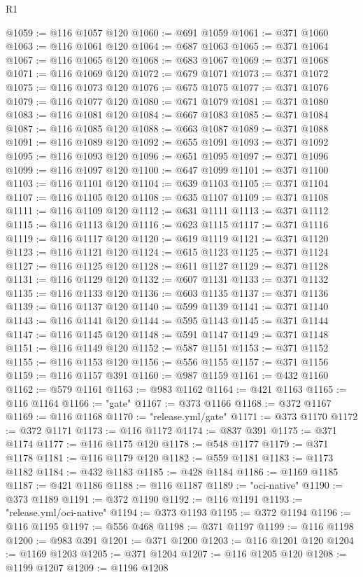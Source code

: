\begin{lexlean}{R1}
\begin{coremodule}
@1059 := @116 @1057 @120
@1060 := @691 @1059
@1061 := @371 @1060
@1063 := @116 @1061 @120
@1064 := @687 @1063
@1065 := @371 @1064
@1067 := @116 @1065 @120
@1068 := @683 @1067
@1069 := @371 @1068
@1071 := @116 @1069 @120
@1072 := @679 @1071
@1073 := @371 @1072
@1075 := @116 @1073 @120
@1076 := @675 @1075
@1077 := @371 @1076
@1079 := @116 @1077 @120
@1080 := @671 @1079
@1081 := @371 @1080
@1083 := @116 @1081 @120
@1084 := @667 @1083
@1085 := @371 @1084
@1087 := @116 @1085 @120
@1088 := @663 @1087
@1089 := @371 @1088
@1091 := @116 @1089 @120
@1092 := @655 @1091
@1093 := @371 @1092
@1095 := @116 @1093 @120
@1096 := @651 @1095
@1097 := @371 @1096
@1099 := @116 @1097 @120
@1100 := @647 @1099
@1101 := @371 @1100
@1103 := @116 @1101 @120
@1104 := @639 @1103
@1105 := @371 @1104
@1107 := @116 @1105 @120
@1108 := @635 @1107
@1109 := @371 @1108
@1111 := @116 @1109 @120
@1112 := @631 @1111
@1113 := @371 @1112
@1115 := @116 @1113 @120
@1116 := @623 @1115
@1117 := @371 @1116
@1119 := @116 @1117 @120
@1120 := @619 @1119
@1121 := @371 @1120
@1123 := @116 @1121 @120
@1124 := @615 @1123
@1125 := @371 @1124
@1127 := @116 @1125 @120
@1128 := @611 @1127
@1129 := @371 @1128
@1131 := @116 @1129 @120
@1132 := @607 @1131
@1133 := @371 @1132
@1135 := @116 @1133 @120
@1136 := @603 @1135
@1137 := @371 @1136
@1139 := @116 @1137 @120
@1140 := @599 @1139
@1141 := @371 @1140
@1143 := @116 @1141 @120
@1144 := @595 @1143
@1145 := @371 @1144
@1147 := @116 @1145 @120
@1148 := @591 @1147
@1149 := @371 @1148
@1151 := @116 @1149 @120
@1152 := @587 @1151
@1153 := @371 @1152
@1155 := @116 @1153 @120
@1156 := @556 @1155
@1157 := @371 @1156
@1159 := @116 @1157 @391
@1160 := @987 @1159
@1161 := @432 @1160
@1162 := @579 @1161
@1163 := @983 @1162
@1164 := @421 @1163
@1165 := @116 @1164
@1166 := "gate"
@1167 := @373 @1166
@1168 := @372 @1167
@1169 := @116 @1168
@1170 := "release.yml/gate"
@1171 := @373 @1170
@1172 := @372 @1171
@1173 := @116 @1172
@1174 := @837 @391
@1175 := @371 @1174
@1177 := @116 @1175 @120
@1178 := @548 @1177
@1179 := @371 @1178
@1181 := @116 @1179 @120
@1182 := @559 @1181
@1183 := @1173 @1182
@1184 := @432 @1183
@1185 := @428 @1184
@1186 := @1169 @1185
@1187 := @421 @1186
@1188 := @116 @1187
@1189 := "oci-native"
@1190 := @373 @1189
@1191 := @372 @1190
@1192 := @116 @1191
@1193 := "release.yml/oci-native"
@1194 := @373 @1193
@1195 := @372 @1194
@1196 := @116 @1195
@1197 := @556 @468
@1198 := @371 @1197
@1199 := @116 @1198
@1200 := @983 @391
@1201 := @371 @1200
@1203 := @116 @1201 @120
@1204 := @1169 @1203
@1205 := @371 @1204
@1207 := @116 @1205 @120
@1208 := @1199 @1207
@1209 := @1196 @1208

\end{coremodule}
\end{lexlean}

